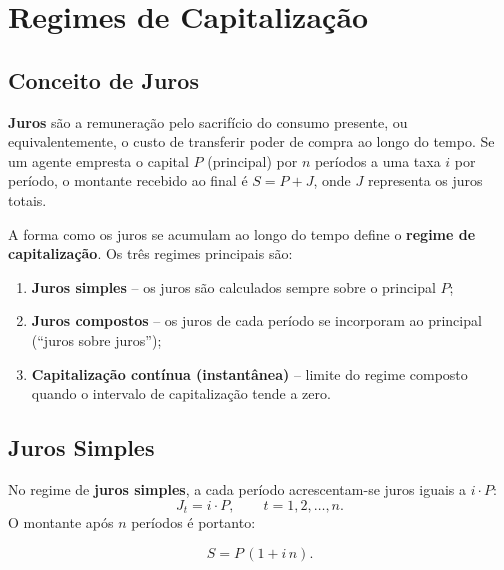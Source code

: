 
\chapter{Regimes de Capitalização}

\section{Conceito de Juros}

\begin{definicao}
\textbf{Juros} são a remuneração pelo sacrifício do consumo presente, ou equivalentemente, o custo de transferir poder de compra ao longo do tempo.
Se um agente empresta o capital $P$ (principal) por $n$ períodos a uma taxa $i$ por período, o montante recebido ao final é $S = P + J$, onde $J$ representa os juros totais.
\end{definicao}

A forma como os juros se acumulam ao longo do tempo define o \textbf{regime de capitalização}. Os três regimes principais são:
\begin{enumerate}[label=\textbf{\arabic*.}]
  \item \textbf{Juros simples} -- os juros são calculados sempre sobre o principal $P$;
  \item \textbf{Juros compostos} -- os juros de cada período se incorporam ao principal (``juros sobre juros'');
  \item \textbf{Capitalização contínua (instantânea)} -- limite do regime composto quando o intervalo de capitalização tende a zero.
\end{enumerate}

\section{Juros Simples}

No regime de \textbf{juros simples}, a cada período acrescentam-se juros iguais a $i \cdot P$:
\[
  J_t = i \cdot P, \qquad t = 1, 2, \ldots, n.
\]
O montante após $n$ períodos é portanto:
\begin{resultado}
\[
  S = P\,(1 + i\,n).
\]
\end{resultado}

